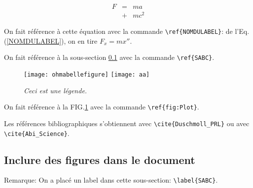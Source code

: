 \documentclass[a4paper,12pt,twoside]{article}
\begin{document}
\begin{eqnarray}
F &=& ma  \nonumber\\
&+& mc^2 
\end{eqnarray}

On fait r\'ef\'erence \`a cette \'equation avec la commande \verb|\ref{NOMDULABEL}|: de l'Eq.(\ref{NOMDULABEL}), on en tire $F_x=mx''$.

On fait r\'ef\'erence \`a la sous-section \ref{SABC} avec la commande 
\verb|\ref{SABC}|.

\begin{figure} %
\begin{center}
\texttt{[image: ohmabellefigure]}
\texttt{[image: aa]}
\end{center}
\caption{\em \label{fig:Plot} %
Ceci est une l\'egende. 
}
\end{figure} %

On fait r\'ef\'erence \`a la FIG.\ref{fig:Plot} avec la commande 
\verb|\ref{fig:Plot}|.

Les r\'ef\'erences bibliographiques \cite{Duschmoll_PRL} 
s'obtiennent avec \verb|\cite{Duschmoll_PRL}| 
ou avec \cite{Abi_Science} \verb|\cite{Abi_Science}|.

\subsection{Inclure des figures dans le document} \label{SABC}
Remarque: On a plac\'e un label dans cette sous-section: \verb|\label{SABC}|.
 
\end{document}
